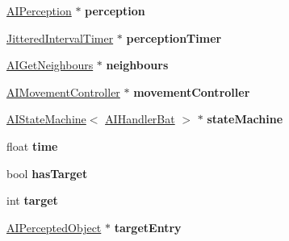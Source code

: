 \begin{DoxyCompactItemize}
\item 
\hypertarget{classAIHandlerBat_ac2317e50d6586d3ab2cfdfad373dfa35}{
\hyperlink{classAIPerception}{\-A\-I\-Perception} $\ast$ {\bfseries perception}}
\label{df/d90/classAIHandlerBat_ac2317e50d6586d3ab2cfdfad373dfa35}

\item 
\hypertarget{classAIHandlerBat_a8667efbe5a60c62f98db5f06942c6010}{
\hyperlink{classJitteredIntervalTimer}{\-Jittered\-Interval\-Timer} $\ast$ {\bfseries perception\-Timer}}
\label{df/d90/classAIHandlerBat_a8667efbe5a60c62f98db5f06942c6010}

\item 
\hypertarget{classAIHandlerBat_a5f9a545cc10f4116b4ebca35375ad51d}{
\hyperlink{classAIGetNeighbours}{\-A\-I\-Get\-Neighbours} $\ast$ {\bfseries neighbours}}
\label{df/d90/classAIHandlerBat_a5f9a545cc10f4116b4ebca35375ad51d}

\item 
\hypertarget{classAIHandlerBat_aed7a97c75e44b2b802ee3ed3fd21ef91}{
\hyperlink{classAIMovementController}{\-A\-I\-Movement\-Controller} $\ast$ {\bfseries movement\-Controller}}
\label{df/d90/classAIHandlerBat_aed7a97c75e44b2b802ee3ed3fd21ef91}

\item 
\hypertarget{classAIHandlerBat_a499ac8c11e8b1953bd96dd57a902a341}{
\hyperlink{classAIStateMachine}{\-A\-I\-State\-Machine}$<$ \hyperlink{classAIHandlerBat}{\-A\-I\-Handler\-Bat} $>$ $\ast$ {\bfseries state\-Machine}}
\label{df/d90/classAIHandlerBat_a499ac8c11e8b1953bd96dd57a902a341}

\item 
\hypertarget{classAIHandlerBat_a599a9d131fba92900a239d25a366ae84}{
float {\bfseries time}}
\label{df/d90/classAIHandlerBat_a599a9d131fba92900a239d25a366ae84}

\item 
\hypertarget{classAIHandlerBat_a1136d7ad40f3d793a39788799ff7b532}{
bool {\bfseries has\-Target}}
\label{df/d90/classAIHandlerBat_a1136d7ad40f3d793a39788799ff7b532}

\item 
\hypertarget{classAIHandlerBat_a94b8ce0f83e1996d6d1ad33b1a4e89f4}{
int {\bfseries target}}
\label{df/d90/classAIHandlerBat_a94b8ce0f83e1996d6d1ad33b1a4e89f4}

\item 
\hypertarget{classAIHandlerBat_ae6ea6058e152781a4b04f3ba4fde4643}{
\hyperlink{classAIPerceptedObject}{\-A\-I\-Percepted\-Object} $\ast$ {\bfseries target\-Entry}}
\label{df/d90/classAIHandlerBat_ae6ea6058e152781a4b04f3ba4fde4643}


\end{DoxyCompactItemize}
